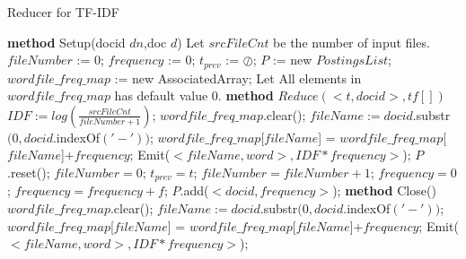 \documentclass[a4paper,UTF8]{article}
\theoremstyle{definition}
\begin{document}
\begin{CJK}{UTF8}{gkai}
\begin{enumerate}
\begin{algorithm}[htb]
\caption{Reducer for TF-IDF}
\label{alg:Framwork}
\begin{algorithmic}[1] %
	 \STATE \textbf{method} Setup(docid $dn$,doc $d$)
	 \STATE Let $srcFileCnt$ be the number of input files.
	 \STATE $fileNumber$ := $0$;
	 \STATE $frequency$ := $0$;
	 \STATE $t_{prev}$ := $\oslash$;
	 \STATE $P$ := new $PostingsList$;
	 \STATE $wordfile\_freq\_map$ := new AssociatedArray;
	 \STATE Let All elements in $wordfile\_freq\_map$ has default value $0$.
	 \STATE 
    \STATE \textbf{method} $Reduce(<t, docid>, tf[])$
		\STATE $IDF := log(\frac{srcFileCnt}{fileNumber + 1})$;
		\STATE $wordfile\_freq\_map$.clear();
			\STATE $fileName := docid$.substr$(0, docid.$indexOf$('-'))$;
			\STATE $wordfile\_freq\_map$[$fileName$] = $wordfile\_freq\_map$[$fileName$]$ + frequency$;
		 \ENDFOR
		 	\STATE Emit($<fileName, word>, IDF*frequency>$);
		 \ENDFOR
		\STATE $P$.reset();
		\STATE $fileNumber = 0$;
	 \ENDIF
	 \STATE $t_{prev} = t$;
	 \STATE $fileNumber = fileNumber + 1$;
	 \STATE $frequency = 0$;
	 	\STATE $frequency = frequency + f$;
	 \ENDFOR
	 \STATE
	 \STATE $P$.add($<docid, frequency>$);
	\STATE
    \STATE \textbf{method} Close()
		\STATE $wordfile\_freq\_map$.clear();
			\STATE $fileName := docid$.substr$(0, docid.$indexOf$('-'))$;
			\STATE $wordfile\_freq\_map$[$fileName$] = $wordfile\_freq\_map$[$fileName$]$ + frequency$;
		 \ENDFOR
		 	\STATE Emit($<fileName, word>, IDF*frequency>$);
		 \ENDFOR
    
\end{algorithmic}
\end{algorithm}
\end{enumerate}


\end{CJK}
\end{document}
